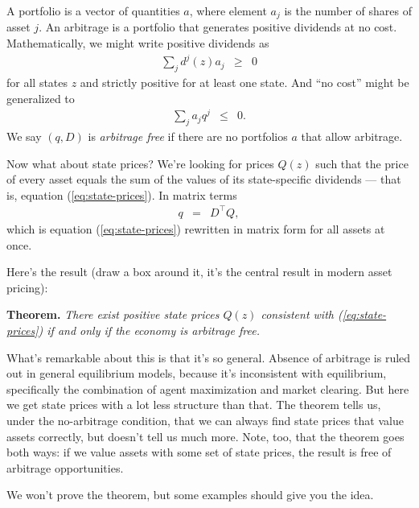 \documentclass[11pt]{article}
\begin{document}
A portfolio is a vector of quantities $a$,
where element $a_j$ is the number of shares of asset $j$.
An arbitrage is a portfolio that generates positive dividends
at no cost.
Mathematically, we might write positive dividends as
\begin{eqnarray*}
    \sum_j d^j(z) a_j &\geq& 0
\end{eqnarray*}
for all states $z$ and strictly positive for at least one state.
And ``no cost'' might be generalized to
\begin{eqnarray*}
    \sum_j a_j q^j &\leq& 0  .
\end{eqnarray*}
We say $(q,D)$ is {\it arbitrage free\/} if there are no portfolios $a$
that allow arbitrage.

Now what about state prices?
We're looking for prices $Q(z)$ %
such that the price of every asset equals the sum of the values
of its state-specific dividends ---
that is, equation (\ref{eq:state-prices}).
In matrix terms
\begin{eqnarray}
    q &=&  D^\top Q,
    \label{eq:state-prices-matrix}
\end{eqnarray}
which is equation (\ref{eq:state-prices}) rewritten in matrix form
for all assets at once.

Here's the result (draw a box around it, it's the central result in modern
asset pricing):

{\bf Theorem.\/}  {\it There exist positive state prices $Q(z)$
consistent with (\ref{eq:state-prices})
if and only if the economy is arbitrage free.\/}

What's remarkable about this is that it's so general.
Absence of arbitrage is ruled out in general equilibrium models,
because it's inconsistent with equilibrium,
specifically the combination of agent maximization and market clearing.
But here we get state prices with a lot less structure than that.
The theorem tells us, under the no-arbitrage condition,
that we can always find state prices that value assets
correctly, but doesn't tell us much more.
Note, too, that the theorem goes both ways:
if we value assets with some set of state prices,
the result is free of arbitrage opportunities.

We won't prove the theorem, but some examples should give you the idea.
\end{document}
